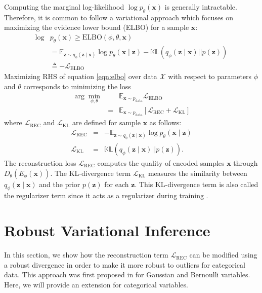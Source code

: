 \documentclass{article}
\def\bx{\mathbf{x}}
\def\bz{\mathbf{z}}
\theoremstyle{plain}
\theoremstyle{definition}
\begin{document}
Computing the marginal log-likelihood $\log p_{\theta}(\bx)$ is generally intractable. Therefore, it is common to follow a variational approach which focuses on maximizing the evidence lower bound (ELBO) for a sample  $\bx$:
\begin{equation}
\begin{split}
\log  &p_{\theta}(\bx) \geq  \textrm{ELBO}(\phi, \theta, \bx) \\
&= \mathbb{E}_{\bz \sim q_{\phi}(\bz \mid \bx)} \log p_{\theta}(\bx \mid \bz) - \mathbb{KL}(q_{\phi}(\bz \mid \bx) || p(\bz)) \\
&\triangleq -\mathcal{L}_{\textrm{ELBO}}
\end{split}
\label{eqn:elbo}
\end{equation}
Maximizing RHS of equation \ref{eqn:elbo} over data $\mathcal{X}$ with respect to parameters $\phi$ and $\theta$ corresponds to minimizing the loss
\begin{eqnarray}
\arg \min_{\phi, \theta} && \mathbb{E}_{\bx \sim p_{\textrm{data}}}  \mathcal{L}_{\textrm{ELBO}} \\
&=& \mathbb{E}_{\bx \sim p_{\textrm{data}}} \left[ \mathcal{L}_{\textrm{REC}} + \mathcal{L}_{\textrm{KL}} \right]
\end{eqnarray}
where $\mathcal{L}_{\textrm{REC}}$ and $\mathcal{L}_{\textrm{KL}}$ are defined for sample $\bx$ as follows:
\begin{eqnarray}
\mathcal{L}_{\textrm{REC}} &=& - \mathbb{E}_{\bz \sim q_{\phi}(\bz \mid \bx)} \log p_{\theta}(\bx \mid \bz) \\
\mathcal{L}_{\textrm{KL}} &=& \mathbb{KL}(q_{\phi}(\bz \mid \bx) || p(\bz)).
\label{eqn:L_rec_kl}
\end{eqnarray}
The reconstruction loss $\mathcal{L}_{\textrm{REC}}$ computes the quality of encoded samples $\bx$ through $D_{\theta} \left( E_{\phi}(\bx) \right)$. The KL-divergence term $\mathcal{L}_{\textrm{KL}}$ measures the similarity between $q_{\phi}(\bz \mid \bx)$ and the prior $p(\bz)$ for each $\bz$. This KL-divergence term is also called the regularizer term since it acts as a regularizer during training \cite{hoffman2016elbo}.

\section{Robust Variational Inference}
In this section, we show how the reconstruction term $\mathcal{L}_{\textrm{REC}}$ can be modified using a robust divergence in order to make it more robust to outliers for categorical data. This approach was first proposed in \cite{akrami2019robust} for Gaussian and Bernoulli variables. Here, we will provide an extension for categorical  variables. 
\end{document}
